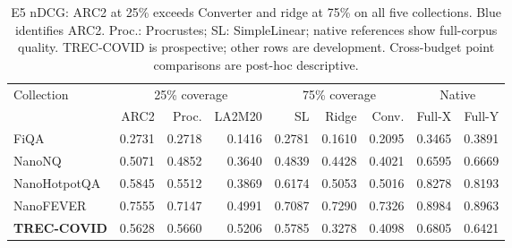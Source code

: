 \begin{table}[t]
\centering
\small
\setlength{\tabcolsep}{2.5pt}
\caption{E5 nDCG: ARC2 at 25\% exceeds Converter and ridge at 75\% on all five collections. Blue identifies ARC2. Proc.: Procrustes; SL: SimpleLinear; native references show full-corpus quality. TREC-COVID is prospective; other rows are development. Cross-budget point comparisons are post-hoc descriptive.}\label{tab:budget-leverage}
\begin{tabular}{lrrrrrrrr}
\toprule
Collection & \multicolumn{3}{c}{25\% coverage} & \multicolumn{3}{c}{75\% coverage} & \multicolumn{2}{c}{Native} \\
\cmidrule(lr){2-4}\cmidrule(lr){5-7}\cmidrule(lr){8-9}
 & ARC2 & Proc. & LA2M20 & SL & Ridge & Conv. & Full-X & Full-Y \\
\midrule
FiQA & \cellcolor{arcPale}\textcolor{arcBlue}{0.2731} & 0.2718 & 0.1416 & 0.2781 & 0.1610 & 0.2095 & 0.3465 & 0.3891 \\
NanoNQ & \cellcolor{arcPale}\textcolor{arcBlue}{0.5071} & 0.4852 & 0.3640 & 0.4839 & 0.4428 & 0.4021 & 0.6595 & 0.6669 \\
NanoHotpotQA & \cellcolor{arcPale}\textcolor{arcBlue}{0.5845} & 0.5512 & 0.3869 & 0.6174 & 0.5053 & 0.5016 & 0.8278 & 0.8193 \\
NanoFEVER & \cellcolor{arcPale}\textcolor{arcBlue}{0.7555} & 0.7147 & 0.4991 & 0.7087 & 0.7290 & 0.7326 & 0.8984 & 0.8963 \\
\midrule \textbf{TREC-COVID} & \cellcolor{arcPale}\textcolor{arcBlue}{0.5628} & 0.5660 & 0.5206 & 0.5785 & 0.3278 & 0.4098 & 0.6805 & 0.6421 \\
\bottomrule
\end{tabular}
\end{table}
